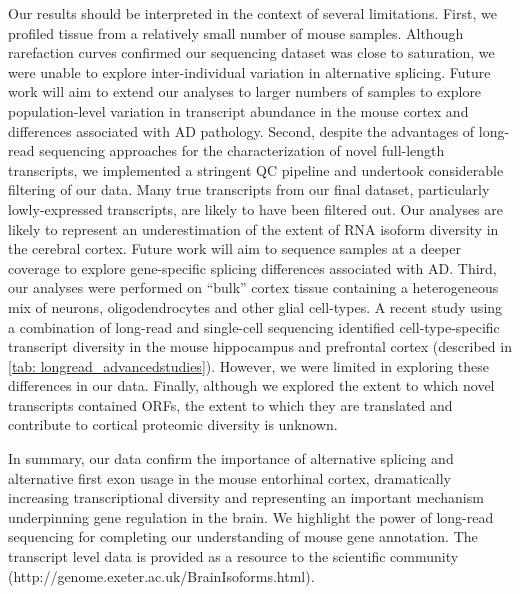 Our results should be interpreted in the context of several limitations. First, we profiled tissue from a relatively small number of mouse samples. Although rarefaction curves confirmed our sequencing dataset was close to saturation, we were unable to explore inter-individual variation in alternative splicing. Future work will aim to extend our analyses to larger numbers of samples to explore population-level variation in transcript abundance in the mouse cortex and differences associated with AD pathology. Second, despite the advantages of long-read sequencing approaches for the characterization of novel full-length transcripts, we implemented a stringent QC pipeline and undertook considerable filtering of our data. Many true transcripts from our final dataset, particularly lowly-expressed transcripts, are likely to have been filtered out. Our analyses are likely to represent an underestimation of the extent of RNA isoform diversity in the cerebral cortex. Future work will aim to sequence samples at a deeper coverage to explore gene-specific splicing differences associated with AD. Third, our analyses were performed on “bulk” cortex tissue containing a heterogeneous mix of neurons, oligodendrocytes and other glial cell-types. A recent study using a combination of long-read and single-cell sequencing identified cell-type-specific transcript diversity in the mouse hippocampus and prefrontal cortex\cite{Joglekar2021} (described in \cref{tab: longread_advancedstudies}). However, we were limited in exploring these differences in our data. Finally, although we explored the extent to which novel transcripts contained ORFs, the extent to which they are translated and contribute to cortical proteomic diversity is unknown.  

In summary, our data confirm the importance of alternative splicing and alternative first exon usage in the mouse entorhinal cortex, dramatically increasing transcriptional diversity and representing an important mechanism underpinning gene regulation in the brain. We highlight the power of long-read sequencing for completing our understanding of mouse gene annotation. The transcript level data is provided as a resource to the scientific community (http://genome.exeter.ac.uk/BrainIsoforms.html). 







